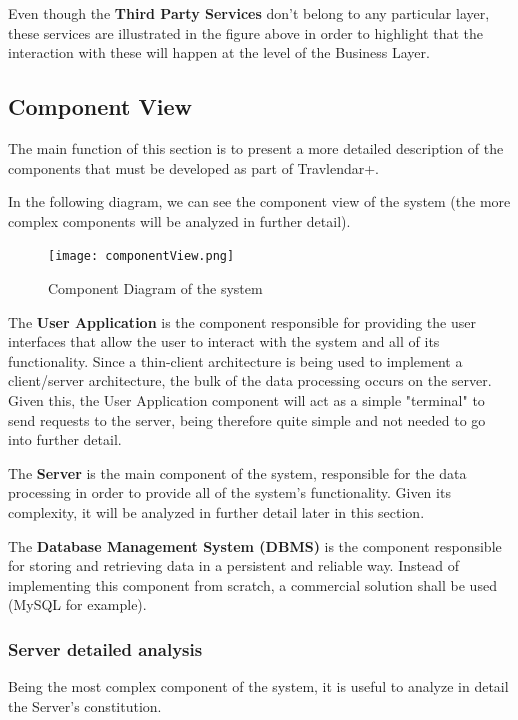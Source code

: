 \documentclass[12pt]{article}
\begin{document}
Even though the \textbf{Third Party Services} don't belong to any particular layer, these services are illustrated in the figure above in order to highlight that the interaction with these will happen at the level of the Business Layer.
\subsection{Component View}
The main function of this section is to present a more detailed description of the components that must be developed as part of Travlendar+.

In the following diagram, we can see the component view of the system (the more complex components will be analyzed in further detail).
\begin{figure}[H]
    \centering
    \texttt{[image: componentView.png]}
    \caption{Component Diagram of the system}
    \label{fig:componentView}
\end{figure}
The \textbf{User Application} is the component responsible for providing the user interfaces that allow the user to interact with the system and all of its functionality. Since a thin-client architecture is being used to implement a client/server architecture, the bulk of the data processing occurs on the server. Given this, the User Application component will act as a simple "terminal" to send requests to the server, being therefore quite simple and not needed to go into further detail.

The \textbf{Server} is the main component of the system, responsible for the data processing in order to provide all of the system's functionality. Given its complexity, it will be analyzed in further detail later in this section.

The \textbf{Database Management System (DBMS)} is the component responsible for storing and retrieving data in a persistent and reliable way. Instead of implementing this component from scratch, a commercial solution shall be used (MySQL for example).

\subsubsection{Server detailed analysis}
Being the most complex component of the system, it is useful to analyze in detail the Server's constitution.
\end{document}
